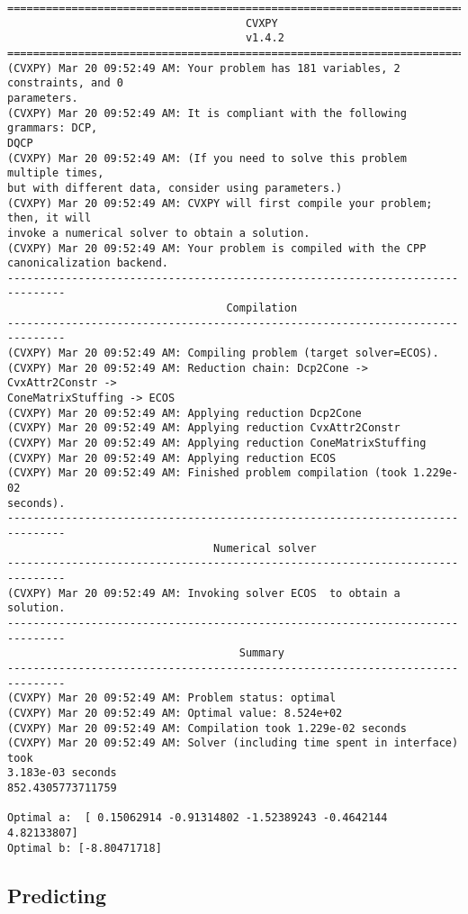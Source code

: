 \documentclass[11pt]{article}
\begin{document}
    \begin{Verbatim}[commandchars=\\\{\}]
===============================================================================
                                     CVXPY
                                     v1.4.2
===============================================================================
(CVXPY) Mar 20 09:52:49 AM: Your problem has 181 variables, 2 constraints, and 0
parameters.
(CVXPY) Mar 20 09:52:49 AM: It is compliant with the following grammars: DCP,
DQCP
(CVXPY) Mar 20 09:52:49 AM: (If you need to solve this problem multiple times,
but with different data, consider using parameters.)
(CVXPY) Mar 20 09:52:49 AM: CVXPY will first compile your problem; then, it will
invoke a numerical solver to obtain a solution.
(CVXPY) Mar 20 09:52:49 AM: Your problem is compiled with the CPP
canonicalization backend.
-------------------------------------------------------------------------------
                                  Compilation
-------------------------------------------------------------------------------
(CVXPY) Mar 20 09:52:49 AM: Compiling problem (target solver=ECOS).
(CVXPY) Mar 20 09:52:49 AM: Reduction chain: Dcp2Cone -> CvxAttr2Constr ->
ConeMatrixStuffing -> ECOS
(CVXPY) Mar 20 09:52:49 AM: Applying reduction Dcp2Cone
(CVXPY) Mar 20 09:52:49 AM: Applying reduction CvxAttr2Constr
(CVXPY) Mar 20 09:52:49 AM: Applying reduction ConeMatrixStuffing
(CVXPY) Mar 20 09:52:49 AM: Applying reduction ECOS
(CVXPY) Mar 20 09:52:49 AM: Finished problem compilation (took 1.229e-02
seconds).
-------------------------------------------------------------------------------
                                Numerical solver
-------------------------------------------------------------------------------
(CVXPY) Mar 20 09:52:49 AM: Invoking solver ECOS  to obtain a solution.
-------------------------------------------------------------------------------
                                    Summary
-------------------------------------------------------------------------------
(CVXPY) Mar 20 09:52:49 AM: Problem status: optimal
(CVXPY) Mar 20 09:52:49 AM: Optimal value: 8.524e+02
(CVXPY) Mar 20 09:52:49 AM: Compilation took 1.229e-02 seconds
(CVXPY) Mar 20 09:52:49 AM: Solver (including time spent in interface) took
3.183e-03 seconds
852.4305773711759

Optimal a:  [ 0.15062914 -0.91314802 -1.52389243 -0.4642144   4.82133807]
Optimal b: [-8.80471718]
    \end{Verbatim}

    \subsection*{Predicting}
\end{document}
